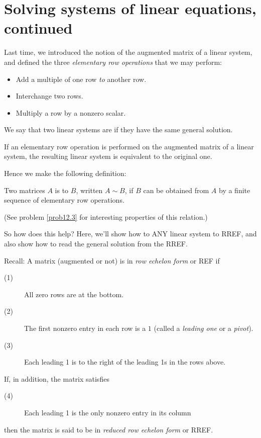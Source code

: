 \chapter{Solving systems of linear equations, continued}
\label{chapter:12solvingsystems2}
   

Last time, we introduced the notion of the augmented matrix
of  a linear system, and defined the three \emph{elementary row operations}
that we may perform:
\begin{itemize}
\item Add a multiple of one row \emph{to} another row.
\item Interchange two rows.
\item Multiply a row by a nonzero scalar.
\end{itemize}

\begin{definition}
We say that two linear systems  are  if they
have the same general solution. 
\end{definition}


\begin{theorem} 
 If an elementary row operation is performed
on the augmented matrix of a linear system, the resulting linear system
is equivalent to the original one.
\end{theorem}

Hence we make the following definition:

\begin{definition}
Two matrices $A$ is  to $B$, written $A \sim B$, if
$B$ can be obtained from $A$ by a finite sequence of elementary
row operations.
\end{definition}

(See problem \ref{prob12.3} for interesting properties of this relation.)

So how does this help?  Here, we'll show how to 
ANY linear system to RREF, and also show how to read the general
solution from the RREF.

Recall: 
A matrix (augmented or not) is in \emph{row echelon form} or REF if
\begin{description}
\item[(1)] All zero rows are at the bottom.
\item[(2)] The first nonzero entry in each row is a $1$ (called a \emph{leading one} or a \emph{pivot}).
\item[(3)] Each leading 1 is to the right of the leading 1s in the rows above.
\end{description}
If, in addition, the matrix satisfies
\begin{description}
\item[(4)] Each leading 1 is the only nonzero entry in its column
\end{description}
then the matrix is said to be in \emph{reduced row echelon form} or RREF.

